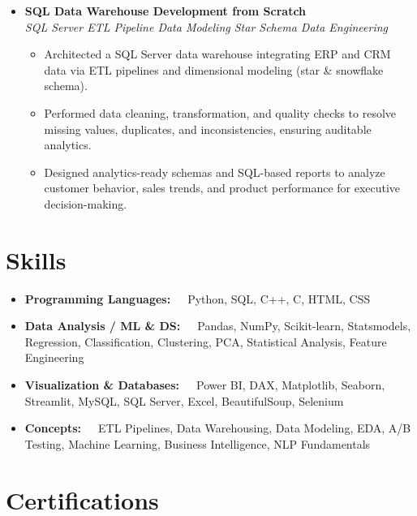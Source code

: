 \documentclass[10pt,letterpaper]{article}
\begin{document}
\begin{itemize}[leftmargin=0pt, label={}]
  \item \textbf{SQL Data Warehouse Development from Scratch}\\
  \textit{SQL Server \textemdash{} ETL Pipeline \textemdash{} Data Modeling \textemdash{} Star Schema \textemdash{} Data Engineering}
  \begin{itemize}
    \item Architected a SQL Server data warehouse integrating ERP and CRM data via
          ETL pipelines and dimensional modeling (star \& snowflake schema).
    \item Performed data cleaning, transformation, and quality checks to resolve missing
          values, duplicates, and inconsistencies, ensuring auditable analytics.
    \item Designed analytics-ready schemas and SQL-based reports to analyze customer
          behavior, sales trends, and product performance for executive decision-making.
  \end{itemize}

\end{itemize}

\section{Skills}

\begin{itemize}[leftmargin=0pt, label={}]
  \item \textbf{Programming Languages:}~~~Python, SQL, C++, C, HTML, CSS
  \item \textbf{Data Analysis / ML \& DS:}~~~Pandas, NumPy, Scikit-learn, Statsmodels,
        Regression, Classification, Clustering, PCA, Statistical Analysis, Feature Engineering
  \item \textbf{Visualization \& Databases:}~~~Power BI, DAX, Matplotlib, Seaborn, Streamlit,
        MySQL, SQL Server, Excel, BeautifulSoup, Selenium
  \item \textbf{Concepts:}~~~ETL Pipelines, Data Warehousing, Data Modeling, EDA,
        A/B Testing, Machine Learning, Business Intelligence, NLP Fundamentals
\end{itemize}

\section{Certifications}
\end{document}
